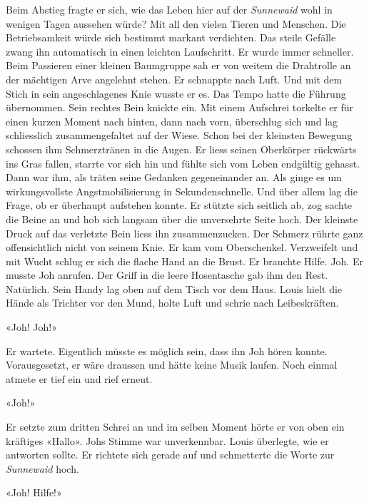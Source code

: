Beim Abstieg fragte er sich, wie das Leben hier auf der \emph{Sunnewaid}
wohl in wenigen Tagen aussehen würde? Mit all den vielen Tieren und Menschen.
Die Betriebsamkeit würde sich bestimmt markant verdichten.
Das steile Gefälle zwang ihn automatisch in einen leichten Laufschritt.
Er wurde immer schneller. Beim Passieren einer kleinen Baumgruppe sah er
von weitem die Drahtrolle an der mächtigen Arve angelehnt stehen. Er
schnappte nach Luft. Und mit dem Stich in sein angeschlagenes Knie
wusste er es. Das Tempo hatte die Führung übernommen. Sein rechtes Bein
knickte ein. Mit einem Aufschrei torkelte er für einen kurzen Moment
nach hinten, dann nach vorn, überschlug sich und lag schliesslich
zusammengefaltet auf der Wiese.
Schon bei der kleinsten Bewegung schossen ihm Schmerztränen in die
Augen. Er liess seinen Oberkörper rückwärts ins Gras fallen, starrte vor
sich hin und fühlte sich vom Leben endgültig gehasst. Dann war ihm, als
träten seine Gedanken gegeneinander an. Als ginge es um wirkungsvollste Angstmobilisierung in Sekundenschnelle. Und
über allem lag die Frage, ob er überhaupt aufstehen konnte. 
Er stützte sich seitlich ab, zog sachte die Beine an und hob sich
langsam über die unversehrte Seite hoch. Der kleinste Druck auf das
verletzte Bein liess ihn zusammenzucken. Der Schmerz rührte ganz
offensichtlich nicht von seinem Knie. Er kam vom Oberschenkel.
Verzweifelt und mit Wucht schlug er sich die flache Hand an die Brust.
Er brauchte Hilfe. Joh. Er musste Joh anrufen. Der Griff in die leere
Hosentasche gab ihm den Rest. Natürlich. Sein Handy lag oben auf dem
Tisch vor dem Haus.
Louis hielt die Hände als Trichter vor den Mund, holte Luft und schrie
nach Leibeskräften.

«Joh! Joh!»

Er wartete. Eigentlich müsste es möglich sein, dass ihn Joh hören
konnte. Vorausgesetzt, er wäre draussen und hätte keine Musik laufen. Noch einmal atmete er tief ein und rief erneut.

«Joh!»

Er setzte zum dritten Schrei an und im selben Moment hörte er von oben
ein kräftiges «Hallo». Johs Stimme war unverkennbar. Louis überlegte, wie er
antworten sollte. Er richtete sich gerade auf und schmetterte die Worte
zur \emph{Sunnewaid} hoch.

«Joh! Hilfe!»
